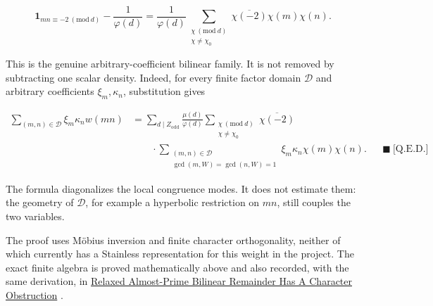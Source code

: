 \begin{equation*}
\mathbf1_{mn\equiv-2\ (\mathrm{mod}\ d)}
-\frac1{\varphi(d)}
=
\frac1{\varphi(d)}
\sum_{\substack{\chi\ (\mathrm{mod}\ d)\\\chi\ne\chi_0}}
\overline{\chi(-2)}\chi(m)\chi(n).
\end{equation*}

This is the genuine arbitrary-coefficient bilinear family. It is not removed
by subtracting one scalar density. Indeed, for every finite factor domain
$\mathcal D$ and arbitrary coefficients $\xi_m,\kappa_n$, substitution gives

\begin{equation*}
\begin{aligned}
\sum_{(m,n)\in\mathcal D}\xi_m\kappa_nw(mn)
&=
\sum_{d\mid Z_{\mathrm{odd}}}
\frac{\mu(d)}{\varphi(d)}
\sum_{\substack{\chi\ (\mathrm{mod}\ d)\\\chi\ne\chi_0}}
\overline{\chi(-2)}\\
&\qquad\cdot
\sum_{\substack{(m,n)\in\mathcal D\\
\gcd(m,W)=\gcd(n,W)=1}}
\xi_m\kappa_n\chi(m)\chi(n).
&&\blacksquare\ \text{[Q.E.D.]}
\end{aligned}
\end{equation*}

The formula diagonalizes the local congruence modes. It does not estimate
them: the geometry of $\mathcal D$, for example a hyperbolic restriction on
$mn$, still couples the two variables.

The proof uses Möbius inversion and finite character orthogonality, neither of
which currently has a Stainless representation for this weight in the
project. The exact finite algebra is proved
mathematically above and also recorded, with the same derivation, in \href{https://github.com/thiagomata/prime-numbers/blob/master/properties/sieve-sequence/relaxed-almost-prime-bilinear-character-obstruction.md}{Relaxed Almost-Prime Bilinear
Remainder Has A Character Obstruction} \cite{bilinearobstruction2026}.
